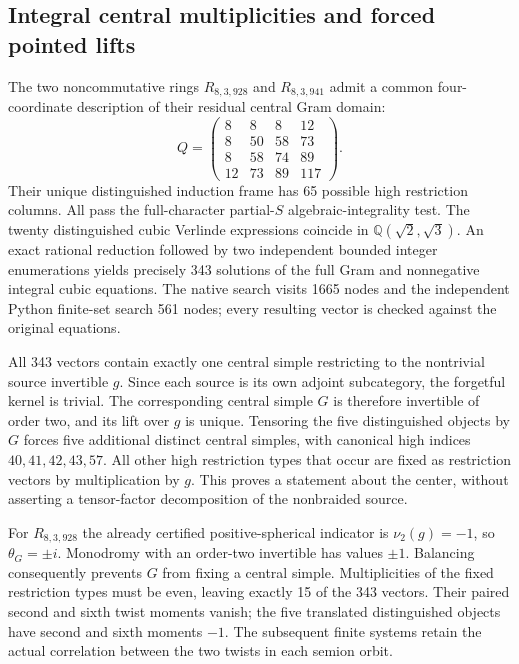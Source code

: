 \subsection{Integral central multiplicities and forced pointed lifts}
\label{subsec:frontier-quartic-integer}

The two noncommutative rings $R_{8,3,928}$ and $R_{8,3,941}$ admit a common
four-coordinate description of their residual central Gram domain:
\[
 Q=\begin{pmatrix}8&8&8&12\\8&50&58&73\\8&58&74&89\\12&73&89&117\end{pmatrix}.
\]
Their unique distinguished induction frame has 65 possible high restriction
columns.  All pass the full-character partial-$S$ algebraic-integrality test.
The twenty distinguished cubic Verlinde expressions coincide in
$\mathbb Q(\sqrt2,\sqrt3)$.  An exact rational reduction followed by two
independent bounded integer enumerations yields precisely 343 solutions of
the full Gram and nonnegative integral cubic equations.  The native search
visits 1665 nodes and the independent Python finite-set search 561 nodes;
every resulting vector is checked against the original equations.

All 343 vectors contain exactly one central simple restricting to the
nontrivial source invertible $g$.  Since each source is its own adjoint
subcategory, the forgetful kernel is trivial.  The corresponding central
simple $G$ is therefore invertible of order two, and its lift over $g$ is
unique.  Tensoring the five distinguished objects by $G$ forces five
additional distinct central simples, with canonical high indices
$40,41,42,43,57$.  All other high restriction types that occur are fixed
as restriction vectors by multiplication by $g$.  This proves a statement
about the center, without asserting a tensor-factor decomposition of the
nonbraided source.

For $R_{8,3,928}$ the already certified positive-spherical indicator is
$\nu_2(g)=-1$, so $\theta_G=\pm i$.  Monodromy with an order-two invertible
has values $\pm1$.  Balancing consequently prevents $G$ from fixing a
central simple.  Multiplicities of the fixed restriction types must be
even, leaving exactly 15 of the 343 vectors.  Their paired second and
sixth twist moments vanish; the five translated distinguished objects
have second and sixth moments $-1$.  The subsequent finite systems retain
the actual correlation between the two twists in each semion orbit.

